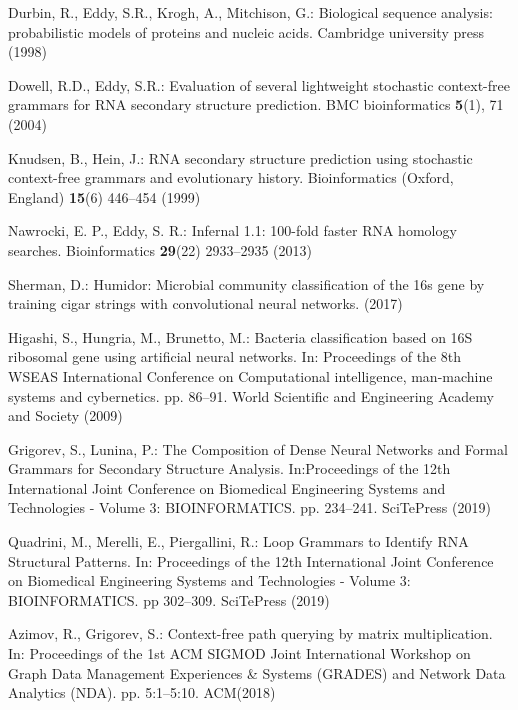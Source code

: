 \documentclass[runningheads]{llncs}
\begin{document}
\begin{thebibliography}{14}
Durbin, R., Eddy, S.R., Krogh, A., Mitchison, G.: Biological sequence analysis: probabilistic models of proteins and nucleic acids. Cambridge university press (1998)

Dowell, R.D., Eddy, S.R.: Evaluation of several lightweight stochastic context-free grammars for RNA secondary structure prediction. BMC bioinformatics \textbf{5}(1), 71 (2004)

Knudsen, B., Hein, J.: RNA secondary structure prediction using stochastic context-free grammars and evolutionary history. Bioinformatics (Oxford, England) \textbf{15}(6) 446--454 (1999)

Nawrocki, E. P., Eddy, S. R.: Infernal 1.1: 100-fold faster RNA homology searches. Bioinformatics \textbf{29}(22) 2933--2935 (2013)

Sherman, D.: Humidor: Microbial community classification of the 16s gene by training cigar strings with convolutional neural networks. (2017)

Higashi, S., Hungria, M., Brunetto, M.: Bacteria classification based on 16S ribosomal gene using artificial neural networks. In: Proceedings of the 8th WSEAS International Conference on Computational intelligence, man-machine systems and cybernetics. pp. 86--91. World Scientific and Engineering Academy and Society (2009)

Grigorev, S., Lunina, P.: The Composition of Dense Neural Networks and Formal Grammars for Secondary Structure Analysis. In:Proceedings of the 12th International Joint Conference on Biomedical Engineering Systems and Technologies - Volume 3: BIOINFORMATICS. pp. 234--241. SciTePress (2019)

Quadrini, M., Merelli, E., Piergallini, R.: Loop Grammars to Identify RNA Structural Patterns. In: Proceedings of the 12th International Joint Conference on Biomedical Engineering Systems and Technologies - Volume 3: BIOINFORMATICS. pp 302--309. SciTePress (2019)

Azimov, R., Grigorev, S.: Context-free path querying by matrix multiplication. In: Proceedings of the 1st ACM SIGMOD Joint International Workshop on Graph Data Management Experiences \& Systems (GRADES) and Network Data Analytics (NDA). pp. 5:1--5:10. ACM(2018)



\end{thebibliography}
\end{document}
